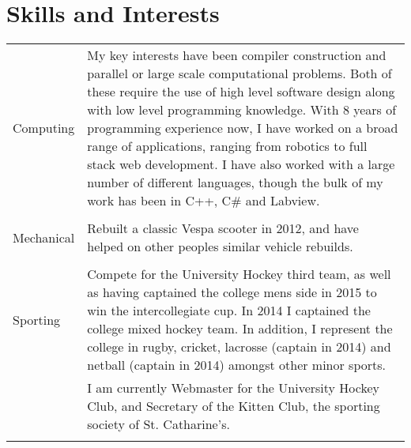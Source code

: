 \documentclass[10pt,a4paper]{article}
\def \rowdiv {\multicolumn{2}{c}{} \\}
\begin{document}
\section{Skills and Interests}
    \begin{tabular}{R{2cm}|p{12cm}}
        Computing   & My key interests have been compiler construction and parallel or large scale computational problems. Both of these require the use of high level software design along with low level programming knowledge. With 8 years of programming experience now, I have worked on a broad range of applications, ranging from robotics to full stack web development. I have also worked with a large number of different languages, though the bulk of my work has been in C++, C\# and Labview. \\ \rowdiv
        Mechanical  & Rebuilt a classic Vespa scooter in 2012, and have helped on other peoples similar vehicle rebuilds. \\ \rowdiv
        Sporting    & Compete for the University Hockey third team, as well as having captained the college mens side in 2015 to win the intercollegiate cup. In 2014 I captained the college mixed hockey team. In addition, I represent the college in rugby, cricket, lacrosse (captain in 2014) and netball (captain in 2014) amongst other minor sports.  \\
                    & I am currently Webmaster for the University Hockey Club, and Secretary of the Kitten Club, the sporting society of St. Catharine's.  \\ \rowdiv
    \end{tabular}
\end{document}
